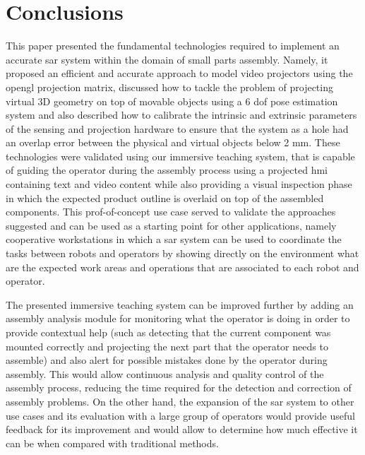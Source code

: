 \section{Conclusions}\label{sec:conclusions}

This paper presented the fundamental technologies required to implement an accurate \gls{sar} system within the domain of small parts assembly. Namely, it proposed an efficient and accurate approach to model video projectors using the \gls{opengl} projection matrix, discussed how to tackle the problem of projecting virtual 3D geometry on top of movable objects using a 6 \gls{dof} pose estimation system and also described how to calibrate the intrinsic and extrinsic parameters of the sensing and projection hardware to ensure that the system as a hole had an overlap error between the physical and virtual objects below 2 mm. These technologies were validated using our immersive teaching system, that is capable of guiding the operator during the assembly process using a projected \gls{hmi} containing text and video content while also providing a visual inspection phase in which the expected product outline is overlaid on top of the assembled components. This prof-of-concept use case served to validate the approaches suggested and can be used as a starting point for other applications, namely cooperative workstations in which a \gls{sar} system can be used to coordinate the tasks between robots and operators by showing directly on the environment what are the expected work areas and operations that are associated to each robot and operator.

The presented immersive teaching system can be improved further by adding an assembly analysis module for monitoring what the operator is doing in order to provide contextual help (such as detecting that the current component was mounted correctly and projecting the next part that the operator needs to assemble) and also alert for possible mistakes done by the operator during assembly. This would allow continuous analysis and quality control of the assembly process, reducing the time required for the detection and correction of assembly problems. On the other hand, the expansion of the \gls{sar} system to other use cases and its evaluation with a large group of operators would provide useful feedback for its improvement and would allow to determine how much effective it can be when compared with traditional methods.
